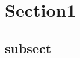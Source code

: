 \documentclass[a4paper,11pt]{article}
\begin{document}
\section{Section1}
\subsection{subsect}
\end{document}
